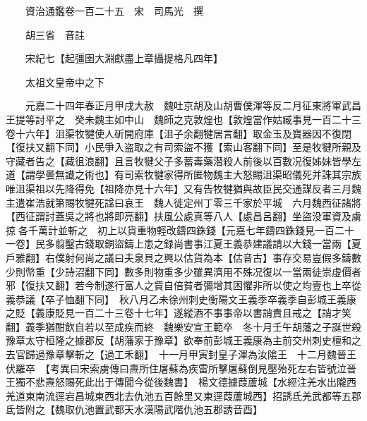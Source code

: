










 


 
 


 

  
  
  
  
  





  
  
  
  
  
 
  

  

  
  
  



  

 
 

  
   




  

  
  


  　　資治通鑑卷一百二十五　宋　司馬光　撰

　　胡三省　音註

　　宋紀七【起彊圉大淵獻盡上章攝提格凡四年】

　　太祖文皇帝中之下

　　元嘉二十四年春正月甲戌大赦　魏吐京胡及山胡曹僕渾等反二月征東將軍武昌王提等討平之　癸未魏主如中山　魏師之克敦煌也【敦煌當作姑臧事見一百二十三卷十六年】沮渠牧犍使人斫開府庫【沮子余翻犍居言翻】取金玉及寶器因不復閉【復扶又翻下同】小民爭入盗取之有司索盜不獲【索山客翻下同】至是牧犍所親及守藏者告之【藏徂浪翻】且言牧犍父子多蓄毒藥潜殺人前後以百數况復姊妹皆學左道【謂學曇無䜟之術也】有司索牧犍家得所匿物魏主大怒賜沮渠昭儀死并誅其宗族唯沮渠祖以先降得免【祖降亦見十六年】又有告牧犍猶與故臣民交通謀反者三月魏主遣崔浩就第賜牧犍死諡曰哀王　魏人徙定州丁零三千家於平城　六月魏西征諸將【西征謂討蓋吳之將也將即亮翻】扶風公處真等八人【處昌呂翻】坐盜没軍資及虜掠各千萬計並斬之　初上以貨重物輕改鑄四銖錢【元嘉七年鑄四銖錢見一百二十一卷】民多翦鑿古錢取銅盜鑄上患之録尚書事江夏王義恭建議請以大錢一當兩【夏戶雅翻】右僕射何尚之議曰夫泉貝之興以估貨為本【估音古】事存交易豈假多鑄數少則幣重【少詩沼翻下同】數多則物重多少雖異濟用不殊况復以一當兩徒崇虛價者邪【復扶又翻】若今制遂行富人之貲自倍貧者彌增其困懼非所以使之均壹也上卒從義恭議【卒子恤翻下同】　秋八月乙未徐州刺史衡陽文王義季卒義季自彭城王義康之貶【義康貶見一百二十三卷十七年】遂縱酒不事事帝以書誚責且戒之【誚才笑翻】義季猶酣飲自若以至成疾而終　魏樂安宣王範卒　冬十月壬午胡藩之子誕世殺豫章太守桓隆之據郡反【胡藩家于豫章】欲奉前彭城王義康為主前交州刺史檀和之去官歸過豫章擊斬之【過工禾翻】　十一月甲寅封皇子渾為汝隂王　十二月魏晉王伏羅卒　【考異曰宋索虜傳曰燾所住屠蘇為疾雷所擊屠蘇倒見壓殆死左右皆號泣晉王獨不悲燾怒賜死此出于傳聞今從後魏書】　楊文德據葭蘆城【水經注羌水出隴西羌道東南流逕宕昌城東西北去仇池五百餘里又東逕葭蘆城西】招誘氐羌武都等五郡氐皆附之【魏取仇池置武都天水漢陽武階仇池五郡誘音酉】

